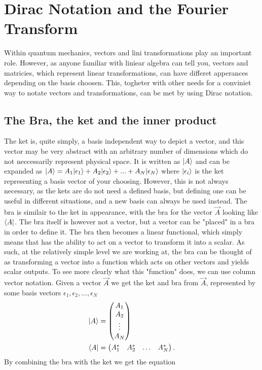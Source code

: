 \section{Dirac Notation and the Fourier Transform} \label{appendix:dirac}
Within quantum mechanics, vectors and lini transformations play an important role. However, as anyone familiar with liniear algebra can tell you, vectors and matricies, which represent linear transformations, can have differet apperances depending on the basis choosen. This, togheter with other needs for a conviniet way to notate vectors and transformations, can be met by using Dirac notation.

\subsection{The Bra, the ket and the inner product}
The ket is, quite simply, a basis independent way to depict a vector, and this vector may be very abstract with an arbitrary number of dimensions which do not neccessarily represent physical space. It is written as $\lvert A\rangle$ and can be expanded as $\lvert A\rangle=A_1\lvert\epsilon_1\rangle+A_2\lvert\epsilon_2\rangle+...+A_N\lvert\epsilon_N\rangle$ where $\lvert\epsilon_i\rangle$ is the ket representing a basis vector of your choosing. However, this is not always necessary, as the kets are do not need a defined basis, but defining one can be useful in different situations, and a new basis can always be used instead. The bra is similair to the ket in appearance, with the bra for the vector $\vec{A}$ looking like $\langle A\rvert$. The bra itself is however not a vector, but a vector can be "placed" in a bra in order to define it. The bra then becomes a linear functional, which simply means that has the ability to act on a vector to transform it into a scalar. As such, at the relatively simple level we are working at, the bra can be thought of as transforming a vector into a function which acts on other vectors and yields scalar outputs. To see more clearly what this "function" does, we can use column vector notation. Given a vector $\vec{A}$ we get the ket and bra from $\vec{A}$, represented by some basis vectors $\epsilon_1,\epsilon_2,...,\epsilon_N$
\begin{align*}
    \lvert A\rangle&=\begin{pmatrix}
    A_1\\
    A_2\\
    \vdots\\
    A_N
    \end{pmatrix} \\
    \langle A\rvert&=\begin{pmatrix}
        A_1^* &A_2^* & \dots&A_N^*
    \end{pmatrix}.
\end{align*} By combining the bra with the ket we get the equation
